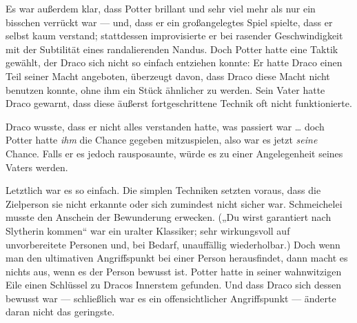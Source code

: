 Es war außerdem klar, dass Potter brillant und sehr viel mehr als nur ein bisschen verrückt war — und, dass er ein großangelegtes Spiel spielte, dass er selbst kaum verstand; stattdessen improvisierte er bei rasender Geschwindigkeit mit der Subtilität eines randalierenden Nandus. Doch Potter hatte eine Taktik gewählt, der Draco sich nicht so einfach entziehen konnte: Er hatte Draco einen Teil seiner Macht angeboten, überzeugt davon, dass Draco diese Macht nicht benutzen konnte, ohne ihm ein Stück ähnlicher zu werden. Sein Vater hatte Draco gewarnt, dass diese äußerst fortgeschrittene Technik oft nicht funktionierte.

Draco wusste, dass er nicht alles verstanden hatte, was passiert war … doch Potter hatte \emph{ihm} die Chance gegeben mitzuspielen, also war es jetzt \emph{seine} Chance. Falls er es jedoch rausposaunte, würde es zu einer Angelegenheit seines Vaters werden.

Letztlich war es so einfach. Die simplen Techniken setzten voraus, dass die Zielperson sie nicht erkannte oder sich zumindest nicht sicher war. Schmeichelei musste den Anschein der Bewunderung erwecken. („Du wirst garantiert nach Slytherin kommen“ war ein uralter Klassiker; sehr wirkungsvoll auf unvorbereitete Personen und, bei Bedarf, unauffällig wiederholbar.) Doch wenn man den ultimativen Angriffspunkt bei einer Person herausfindet, dann macht es nichts aus, wenn es der Person bewusst ist. Potter hatte in seiner wahnwitzigen Eile einen Schlüssel zu Dracos Innerstem gefunden. Und dass Draco sich dessen bewusst war — schließlich war es ein offensichtlicher Angriffspunkt — änderte daran nicht das geringste.

